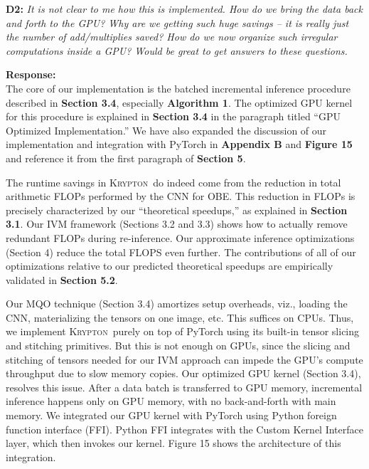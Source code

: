 \documentclass[preprint]{vldb}
\newcommand{\system}{\textsc{Krypton}}
\begin{document}
\vspace{2mm}
\noindent \textbf{D2:} \textit{It is not clear to me how this is implemented. How do we bring the data back and forth to the GPU? Why are we getting such huge savings -- it is really just the number of add/multiplies saved? How do we now organize such irregular computations inside a GPU? Would be great to get answers to these questions.}

\vspace{2mm}
\noindent \textbf{Response:}\\
The core of our implementation is the batched incremental inference procedure described in \textbf{Section 3.4}, especially \textbf{Algorithm 1}. The optimized GPU kernel for this procedure is explained in \textbf{Section 3.4} in the paragraph titled ``GPU Optimized Implementation.'' We have also expanded the discussion of our implementation and integration with PyTorch in \textbf{Appendix B} and \textbf{Figure 15} and reference it from the first paragraph of \textbf{Section 5}.

The runtime savings in \system ~do indeed come from the reduction in total arithmetic FLOPs performed by the CNN for OBE. This reduction in FLOPs is precisely characterized by our ``theoretical speedups,'' as explained in \textbf{Section 3.1}. Our IVM framework (Sections 3.2 and 3.3) shows how to actually remove redundant FLOPs during re-inference. Our approximate inference optimizations (Section 4) reduce the total FLOPS even further. The contributions of all of our optimizations relative to our predicted theoretical speedups are empirically validated in \textbf{Section 5.2}.

Our MQO technique (Section 3.4) amortizes setup overheads, viz., loading the CNN, materializing the tensors on one image, etc. This suffices on CPUs. Thus, we implement \system ~purely on top of PyTorch using its built-in tensor slicing and stitching primitives. But this is not enough on GPUs, since the slicing and stitching of tensors needed for our IVM approach can impede the GPU's compute throughput due to slow memory copies. Our optimized GPU kernel (Section 3.4), resolves this issue. After a data batch is transferred to GPU memory, incremental inference happens only on GPU memory, with no back-and-forth with main memory. We integrated our GPU kernel with PyTorch using Python foreign function interface (FFI). Python FFI integrates with the Custom Kernel Interface layer, which then invokes our kernel. Figure 15 shows the architecture of this integration.
\end{document}
